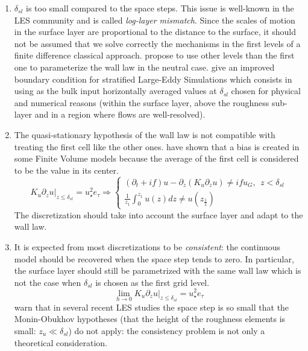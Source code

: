 \begin{enumerate}
	\item $\delta_{sl}$ is too small compared to the space steps.
		This issue is well-known
		in the LES community and is called
		\textit{log-layer mismatch}.
		Since the scales of motion
		in the surface layer are proportional to the distance
		to the surface, it should not be assumed that we solve
		correctly the mechanisms in the first levels
		of a finite difference classical approach.
		\cite{kawai_wall-modeling_2012} propose to use other
		levels than the first one to parameterize the
		wall law in the neutral case.
		\cite{maronga_improved_2020} give an improved
		boundary condition for stratified Large-Eddy Simulations
		which consists in using as the bulk input
		horizontally averaged values at
		$\delta_{sl}$ chosen for physical and numerical
		reasons (within the surface layer, above the
		roughness sub-layer and in a region where flows are
		well-resolved).
	\item The quasi-stationary hypothesis of the wall law is
		not compatible with treating the first cell like
		the other ones.
		\cite{nishizawa_surface_2018} have shown that a
		bias is created in some Finite Volume models
		because the average of the first cell is considered
		to be the value in its center.
		\begin{equation}
		\left.K_u \partial_z u\right|_{z\leq\delta_{sl}}
			= u_\star^2 e_\tau
		\Rightarrow
		\begin{cases}
  (\partial_t + if) u - \partial_z (K_u \partial_z u) \neq if u_G
			, ~~ z < \delta_{sl}\\
		\frac{1}{z_1}\int_0^{z_1}u(z) dz \neq u(z_\frac{1}{2})
		\end{cases}
		\end{equation}
		The discretization should take into account the
		surface layer and adapt to the wall law.
	\item It is expected from most discretizations to be
		\textit{consistent}: the continuous
		model should be recovered when the space step tends
		to zero.  In particular, the surface layer should
		still be parametrized with the same wall law which
		is not the case when $\delta_{sl}$ is chosen
		as the first grid
		level.
		\begin{equation}
			\lim_{h\rightarrow 0}
		\left.K_u \partial_z u\right|_{z\leq\delta_{sl}}=
			u_\star^2 e_\tau
		\end{equation}
		\cite{basu_cautionary_2017} warn that
		in several recent LES studies the space step is
		so small that the Monin-Obukhov hypotheses
		(that the height of the roughness elements is small:
		$z_u \ll \delta_{sl}$)
		do not apply: the consistency problem is not only
		a theoretical consideration.
\end{enumerate}
